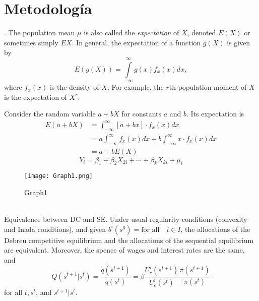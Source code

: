 	\chapter{Metodología}\label{Cap: Metodología}
		\lipsum[1-4]. 
		\newpage
		The population mean $\mu$ is also called the \textit{expectation}
		of $X$, denoted $E(X)$ or sometimes simply $EX$. In general,
		the expectation of a function $g(X)$ is given by
		\begin{equation}
			E\left(g\left(X\right)\right) =
			\int\limits_{-\infty}^{\infty}g(x)f_{x}(x)dx,
		\end{equation}
		where $f_{x}(x)$ is the density of $X$. For example, the $r$th population moment of $X$ is the expectation of $X^{r}$.
		
		Consider the random variable $ a + bX$ for constants $a$ and $b$.
		Its expectation is 
		\begin{equation}
			\begin{aligned}
				E\left(a+bX\right) &= \int_{-\infty}^{\infty}
				\left[a + bx\right]\cdot f_{x}(x)dx \\
				&= a\int_{-\infty}^{\infty}f_{x}(x)dx  + 
				b\int_{-\infty}^{\infty}x\cdot f_{x}(x)dx\\
				&= a + bE(X)
			\end{aligned}
		\end{equation}
		\lipsum[1]
		\begin{equation}\label{eq: MLG}
			Y_{i} = \beta_{1} + \beta_{2}X_{2i} + \cdots + \beta_{k}X_{ki} + \mu_{i}
		\end{equation}
		\lipsum[1]
		\begin{figure}[h!]
			\centering
			\texttt{[image: Graph1.png]}
			\caption{Graph1}
			\label{fig: Graph1}
		\end{figure}
		\lipsum[1] 
		\vspace{0.7cm}\\
		\textcolor{red!75}{Equivalence between DC and SE}. Under usual
		regularity conditions (convexity and Inada conditions), and given
		$b^{i}(s^{0}) = \text{for all} \quad i \in I$, the allocations of the Debreu
		competitive equilibrium and the allocations of the sequential equilibrium
		are equivalent. Moreover, the spence of wages and interest rates are the same, and
		\begin{equation}\label{eq: DC and SE}
			Q(s^{t+1}|s^{t}) = \frac{q(s^{t+1})}{q(s^{t})} =
			\beta \frac{U_{c}^{i}(s^{t+1})}{U_{c}^{i}(s^{t})} \frac{\pi(s^{t+1})}{\pi(s^{t})}
		\end{equation}
		for all $ t, s^{t}$, and $s^{t+1}|s^{t}$.
